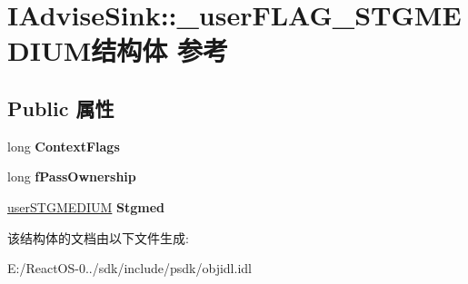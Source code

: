 \hypertarget{struct_i_advise_sink_1_1__user_f_l_a_g___s_t_g_m_e_d_i_u_m}{}\section{I\+Advise\+Sink\+:\+:\+\_\+user\+F\+L\+A\+G\+\_\+\+S\+T\+G\+M\+E\+D\+I\+U\+M结构体 参考}
\label{struct_i_advise_sink_1_1__user_f_l_a_g___s_t_g_m_e_d_i_u_m}
\subsection*{Public 属性}
\begin{DoxyCompactItemize}
\item 
\mbox{\label{struct_i_advise_sink_1_1__user_f_l_a_g___s_t_g_m_e_d_i_u_m_a6ada456381b8d803600fcab36a85f14c}} 
long {\bfseries Context\+Flags}
\item 
\mbox{\label{struct_i_advise_sink_1_1__user_f_l_a_g___s_t_g_m_e_d_i_u_m_ae5ede6e06861a4f64dff884bb5f8d89f}} 
long {\bfseries f\+Pass\+Ownership}
\item 
\mbox{\label{struct_i_advise_sink_1_1__user_f_l_a_g___s_t_g_m_e_d_i_u_m_a0e29ae5809e6396bd3f52a2addf843b4}} 
\hyperlink{struct_i_advise_sink_1_1__user_s_t_g_m_e_d_i_u_m}{user\+S\+T\+G\+M\+E\+D\+I\+UM} {\bfseries Stgmed}
\end{DoxyCompactItemize}


该结构体的文档由以下文件生成\+:\begin{DoxyCompactItemize}
\item 
E\+:/\+React\+O\+S-\/0../sdk/include/psdk/objidl.\+idl\end{DoxyCompactItemize}
